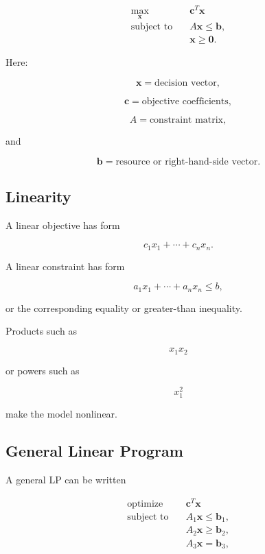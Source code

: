 \[
\boxed{
\begin{aligned}
\max_{\mathbf{x}}
\quad&
\mathbf{c}^T\mathbf{x}
\\
\text{subject to}
\quad&
A\mathbf{x}\leq\mathbf{b},
\\
&
\mathbf{x}\geq\mathbf{0}.
\end{aligned}
}
\]

Here:

\[
\mathbf{x}
=
\text{decision vector},
\]

\[
\mathbf{c}
=
\text{objective coefficients},
\]

\[
A
=
\text{constraint matrix},
\]

and

\[
\mathbf{b}
=
\text{resource or right-hand-side vector}.
\]

\subsection{Linearity}
\label{subsec:linear-programming-linearity}

A linear objective has form

\[
\boxed{
c_1x_1+\cdots+c_nx_n.
}
\]

A linear constraint has form

\[
\boxed{
a_1x_1+\cdots+a_nx_n
\leq
b,
}
\]

or the corresponding equality or greater-than inequality.

Products such as

\[
x_1x_2
\]

or powers such as

\[
x_1^2
\]

make the model nonlinear.

\subsection{General Linear Program}
\label{subsec:general-linear-program}

A general LP can be written

\[
\boxed{
\begin{aligned}
\text{optimize}
\quad&
\mathbf{c}^T\mathbf{x}
\\
\text{subject to}
\quad&
A_1\mathbf{x}\leq\mathbf{b}_1,
\\
&
A_2\mathbf{x}\geq\mathbf{b}_2,
\\
&
A_3\mathbf{x}=\mathbf{b}_3,
\end{aligned}
}
\]

